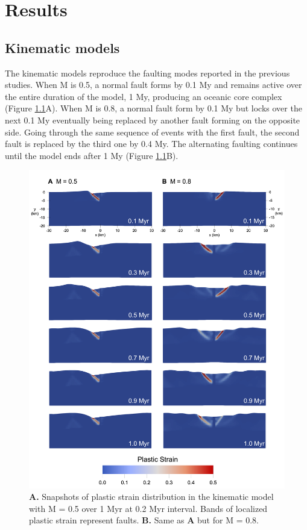\documentclass[letterpaper,12pt,notitle]{memphisthesis}                     %
\begin{document}
\chapter{Results}

\section{Kinematic models}

The kinematic models reproduce the faulting modes reported in the previous studies. When M is 0.5, a normal fault forms by 0.1 My and remains active over the entire duration of the model, 1 My, producing an oceanic core complex (Figure \ref{fig:kfault}A). When M is 0.8, a normal fault form by 0.1 My but locks over the next 0.1 My eventually being replaced by another fault forming on the opposite side. Going through the same sequence of events with the first fault, the second fault is replaced by the third one by 0.4 My. The alternating faulting continues until the model ends after 1 My (Figure \ref{fig:kfault}B).
%
\begin{figure}[!htb]
	\centering
	\includegraphics[width=0.74\linewidth,trim=20 30 20 20,clip]{./figs/kfault.png}
	\caption{ \textbf{A.} Snapshots of plastic strain distribution in the kinematic model with M = 0.5 over 1 Myr at 0.2 Myr interval. Bands of localized plastic strain represent faults. \textbf{B.} Same as \textbf{A} but for M = 0.8.}
	\label{fig:kfault}
\end{figure}
\end{document}
